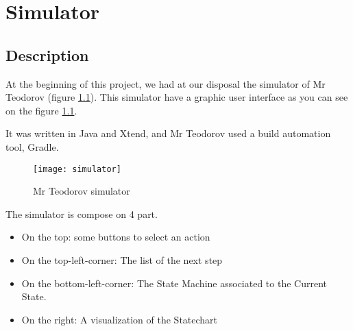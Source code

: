 
\chapter{Simulator}
\label{chap:simulator}
\section{Description}


At the beginning of this project, we had at our disposal the simulator of Mr Teodorov (figure \ref{fig:sim}). This simulator have a graphic user interface as you can see on the figure \ref{fig:sim}.

It was written in Java and Xtend, and Mr Teodorov used a build automation tool, Gradle.

\begin{figure}[h]
  \centering
  \texttt{[image: simulator]}
  \caption{Mr Teodorov simulator}
  \label{fig:sim}
\end{figure}


The simulator is compose on 4 part.
\begin{itemize}
\item On the top: some buttons to select an action
\item On the top-left-corner: The list of the next step
\item On the bottom-left-corner: The State Machine associated to the Current State.
\item On the right: A visualization of the Statechart
\end{itemize}







